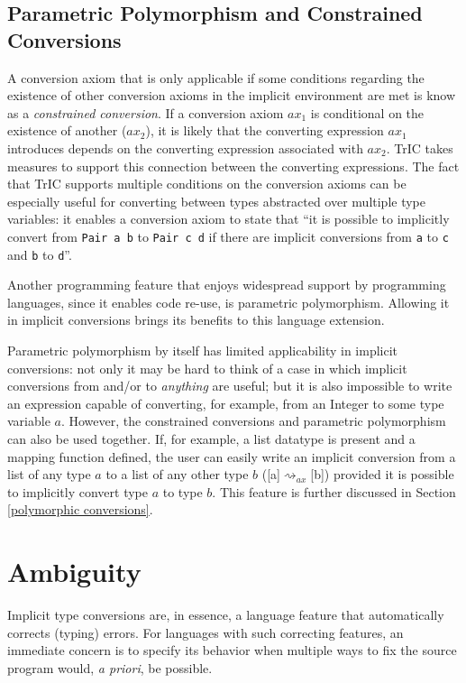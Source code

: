 \subsection{Parametric Polymorphism and Constrained Conversions}
\label{param4}
A conversion axiom that is only applicable if some conditions regarding the existence of other conversion axioms in the implicit environment are met is know as a \textit{constrained conversion}. If a conversion axiom $ax_1$ is conditional on the existence of another ($ax_2$), it is likely that the converting expression $ax_1$ introduces depends on the converting expression associated with $ax_2$. TrIC takes measures to support this connection between the converting expressions. The fact that TrIC supports multiple conditions on the conversion axioms can be especially useful for converting between types abstracted over multiple type variables: it enables a conversion axiom to state that ``it is possible to implicitly convert from \texttt{Pair a b} to \texttt{Pair c d} if there are implicit conversions from \texttt{a} to \texttt{c} and \texttt{b} to \texttt{d}''.

Another programming feature that enjoys widespread support by programming languages, since it enables code re-use, is parametric polymorphism. Allowing it in implicit conversions brings its benefits to this language extension.

Parametric polymorphism by itself has limited applicability in implicit conversions: not only it may be hard to think of a case in which implicit conversions from and/or to \textit{anything} are useful; but it is also impossible to write an expression capable of converting, for example, from an Integer to some type variable $a$. However, the constrained conversions and parametric polymorphism can also be used together. If, for example, a list datatype is present and a mapping function defined, the user can easily write an implicit conversion from a list of any type $a$ to a list of any other type $b$ ([a]$\rightsquigarrow_{ax}$[b]) provided it is possible to implicitly convert type $a$ to type $b$. This feature is further discussed in Section \ref{polymorphic conversions}.



\section{Ambiguity}
\label{ambiguity}
Implicit type conversions are, in essence, a language feature that automatically corrects (typing) errors. For languages with such correcting features, an immediate concern is to specify its behavior when multiple ways to fix the source program would, \textit{a priori}, be possible. 

